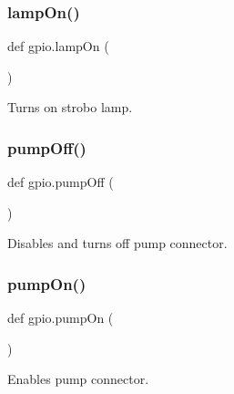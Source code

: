 \subsubsection{\texorpdfstring{lamp\+On()}{lampOn()}}
{\footnotesize\ttfamily def gpio.\+lamp\+On (\begin{DoxyParamCaption}{ }\end{DoxyParamCaption})}

\begin{DoxyVerb}Turns on strobo lamp.
\end{DoxyVerb}
 \mbox{\label{namespacegpio_a9ca03a388bd950acaf08b0469d9c30d5}} 
\subsubsection{\texorpdfstring{pump\+Off()}{pumpOff()}}
{\footnotesize\ttfamily def gpio.\+pump\+Off (\begin{DoxyParamCaption}{ }\end{DoxyParamCaption})}

\begin{DoxyVerb}Disables and turns off pump connector.
\end{DoxyVerb}
 \mbox{\label{namespacegpio_aad3cd613f686071fa50120d6038de384}} 
\subsubsection{\texorpdfstring{pump\+On()}{pumpOn()}}
{\footnotesize\ttfamily def gpio.\+pump\+On (\begin{DoxyParamCaption}{ }\end{DoxyParamCaption})}

\begin{DoxyVerb}Enables pump connector.
\end{DoxyVerb}
 